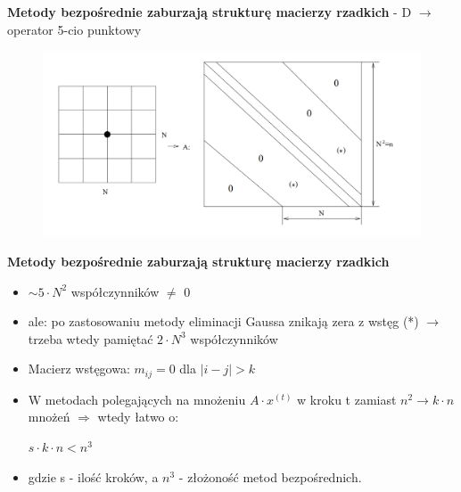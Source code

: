\begin{frame}{}
  \textbf{Metody bezpośrednie zaburzają strukturę macierzy rzadkich}
   - D $\rightarrow$ operator 5-cio punktowy
  \begin{figure}
    \centering
    \includegraphics[height=0.75\textheight, width=1.1\textwidth]{img/12/iteracja1}
  \end{figure}
\end{frame}

\begin{frame}{}
  \begin{block}{\textbf{Metody bezpośrednie zaburzają strukturę macierzy rzadkich}}
    \begin{itemize}
      \item{$\sim 5 \cdot N^2$ współczynników $\neq$ 0}
      \item{ale: po zastosowaniu metody eliminacji Gaussa znikają zera z wstęg
      \newline (*) $\rightarrow$ trzeba wtedy pamiętać $2 \cdot N^3$ współczynników}
      \item{Macierz wstęgowa: $m_{ij}=0$ dla $|i-j|>k$}
      \item W metodach polegających na mnożeniu $A \cdot x^{(t)}$ w kroku t zamiast $n^2 \rightarrow k \cdot n$ mnożeń $\Rightarrow$ wtedy łatwo o:
      \begin{center}
      $s \cdot k \cdot n<n^3$ %
      \end{center}
      \item gdzie s - ilość kroków, a $n^3$ - złożoność metod bezpośrednich.
    \end{itemize}
  \end{block}
\end{frame}
